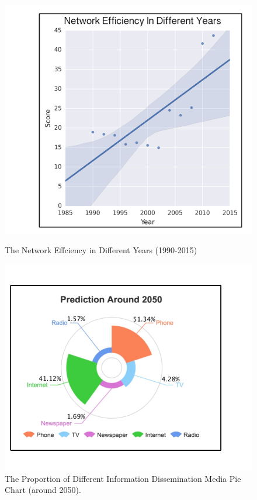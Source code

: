 \documentclass[a4paper,11pt]{article}
\begin{document}
\begin{figure}[!h]
  \centering %
  \begin{minipage}[t]{.49\linewidth}
  \includegraphics[width=1\textwidth]{./Pic/P3_.png}
  \caption{The Network Effciency in Different Years (1990-2015)}
  \end{minipage}
  \begin{minipage}[t]{.49\linewidth}
  \includegraphics[width=1\textwidth]{./Pic/P3.png}
  \caption{The Proportion of Different Information Dissemination Media Pie Chart (around 2050).}
  \end{minipage}
\end{figure}
\end{document}
